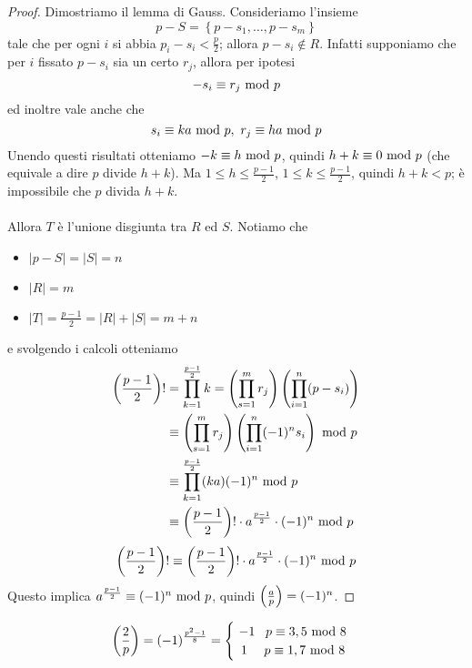 \begin{proof}
	Dimostriamo il lemma di Gauss. Consideriamo l'insieme
	\begin{equation*}
	p-S=\left\{p-s_1,\dots,p-s_m\right\}
	\end{equation*}
	tale che per ogni $i$ si abbia $p_i-s_i<\frac{p}{2}$; allora $p-s_i\notin R$. Infatti supponiamo che per $i$ fissato $p-s_i$ sia un certo $r_j$, allora per ipotesi
	\begin{equation*}
	-s_i\equiv r_j\ \mathrm{mod}\ p
	\end{equation*}
	ed inoltre vale anche che 
	\begin{equation*}
	s_i\equiv ka\ \mathrm{mod}\ p, \ r_j\equiv ha\ \mathrm{mod}\ p
	\end{equation*}
	Unendo questi risultati otteniamo $-k\equiv h\ \mathrm{mod}\ p$, quindi $h+k\equiv0\ \mathrm{mod}\ p$ (che equivale a dire $p$ divide $h+k$). Ma $1\leq h\leq\frac{p-1}{2}$, $1\leq k\leq\frac{p-1}{2}$, quindi $h+k<p$; è impossibile che $p$ divida $h+k$. \\ \\ 
	Allora $T$ è l'unione disgiunta tra $R$ ed $S$. Notiamo che 
	\begin{itemize}
		\item $|p-S|=|S|=n$
		\item $|R|=m$
		\item $|T|=\frac{p-1}{2}=|R|+|S|=m+n$
	\end{itemize}
	e svolgendo i calcoli otteniamo 
	\begin{align*}
	\left(\frac{p-1}{2}\right)!
	&=\prod_{k=1}^{\frac{p-1}{2}}k=\left(\prod_{s=1}^{m}r_j\right)\left(\prod_{i=1}^{n}(p-s_i)\right)\\
	&\equiv\left(\prod_{s=1}^{m}r_j\right)\left(\prod_{i=1}^{n}(-1)^ns_i\right)\ \mathrm{mod}\ p\\
	&\equiv\prod_{k=1}^{\frac{p-1}{2}}(ka)(-1)^n\ \mathrm{mod}\ p\\
	&\equiv\left(\frac{p-1}{2}\right)!\cdot a^{\frac{p-1}{2}}\cdot(-1)^n\ \mathrm{mod}\ p
	\end{align*}
	\begin{equation*}
	\left(\frac{p-1}{2}\right)!\equiv\left(\frac{p-1}{2}\right)!\cdot a^{\frac{p-1}{2}}\cdot(-1)^n\ \mathrm{mod}\ p
	\end{equation*}
	Questo implica $a^{\frac{p-1}{2}}\equiv(-1)^n\ \mathrm{mod}\ p$, quindi $\left(\frac{a}{p}\right)=(-1)^n$.
\end{proof}
\begin{corollario}
	\begin{equation*}
	\left(\frac{2}{p}\right)=(-1)^{\frac{p^2-1}{8}}=
	\begin{cases}
	\ -1 \ \ \,p\equiv3,5\ \mathrm{mod}\ 8\\
	\ \,1 \ \ \ \ p\equiv1,7\ \mathrm{mod}\ 8\\
	\end{cases}
	\end{equation*}
\end{corollario}
